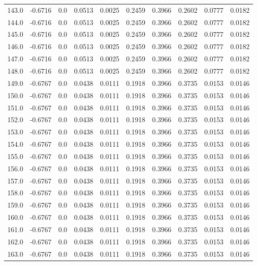 \begin{longtable}{lrrrrrrrrr}
143.0 & -0.6716 & 0.0 & 0.0513 & 0.0025 & 0.2459 & 0.3966 & 0.2602 & 0.0777 & 0.0182 \\
144.0 & -0.6716 & 0.0 & 0.0513 & 0.0025 & 0.2459 & 0.3966 & 0.2602 & 0.0777 & 0.0182 \\
145.0 & -0.6716 & 0.0 & 0.0513 & 0.0025 & 0.2459 & 0.3966 & 0.2602 & 0.0777 & 0.0182 \\
146.0 & -0.6716 & 0.0 & 0.0513 & 0.0025 & 0.2459 & 0.3966 & 0.2602 & 0.0777 & 0.0182 \\
147.0 & -0.6716 & 0.0 & 0.0513 & 0.0025 & 0.2459 & 0.3966 & 0.2602 & 0.0777 & 0.0182 \\
148.0 & -0.6716 & 0.0 & 0.0513 & 0.0025 & 0.2459 & 0.3966 & 0.2602 & 0.0777 & 0.0182 \\
149.0 & -0.6767 & 0.0 & 0.0438 & 0.0111 & 0.1918 & 0.3966 & 0.3735 & 0.0153 & 0.0146 \\
150.0 & -0.6767 & 0.0 & 0.0438 & 0.0111 & 0.1918 & 0.3966 & 0.3735 & 0.0153 & 0.0146 \\
151.0 & -0.6767 & 0.0 & 0.0438 & 0.0111 & 0.1918 & 0.3966 & 0.3735 & 0.0153 & 0.0146 \\
152.0 & -0.6767 & 0.0 & 0.0438 & 0.0111 & 0.1918 & 0.3966 & 0.3735 & 0.0153 & 0.0146 \\
153.0 & -0.6767 & 0.0 & 0.0438 & 0.0111 & 0.1918 & 0.3966 & 0.3735 & 0.0153 & 0.0146 \\
154.0 & -0.6767 & 0.0 & 0.0438 & 0.0111 & 0.1918 & 0.3966 & 0.3735 & 0.0153 & 0.0146 \\
155.0 & -0.6767 & 0.0 & 0.0438 & 0.0111 & 0.1918 & 0.3966 & 0.3735 & 0.0153 & 0.0146 \\
156.0 & -0.6767 & 0.0 & 0.0438 & 0.0111 & 0.1918 & 0.3966 & 0.3735 & 0.0153 & 0.0146 \\
157.0 & -0.6767 & 0.0 & 0.0438 & 0.0111 & 0.1918 & 0.3966 & 0.3735 & 0.0153 & 0.0146 \\
158.0 & -0.6767 & 0.0 & 0.0438 & 0.0111 & 0.1918 & 0.3966 & 0.3735 & 0.0153 & 0.0146 \\
159.0 & -0.6767 & 0.0 & 0.0438 & 0.0111 & 0.1918 & 0.3966 & 0.3735 & 0.0153 & 0.0146 \\
160.0 & -0.6767 & 0.0 & 0.0438 & 0.0111 & 0.1918 & 0.3966 & 0.3735 & 0.0153 & 0.0146 \\
161.0 & -0.6767 & 0.0 & 0.0438 & 0.0111 & 0.1918 & 0.3966 & 0.3735 & 0.0153 & 0.0146 \\
162.0 & -0.6767 & 0.0 & 0.0438 & 0.0111 & 0.1918 & 0.3966 & 0.3735 & 0.0153 & 0.0146 \\
163.0 & -0.6767 & 0.0 & 0.0438 & 0.0111 & 0.1918 & 0.3966 & 0.3735 & 0.0153 & 0.0146 \\

\end{longtable}
